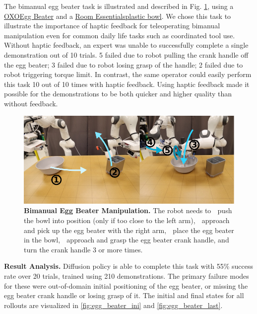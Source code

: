 The bimanual egg beater task is illustrated and described in Fig. \ref{fig:real_egg_beater}, using a
\href{https://www.oxo.com/egg-beater.html}{OXO\legalTM Egg Beater} and a
\href{https://www.target.com/p/114oz-plastic-serving-bowl-jet-gray-room-essentials-8482/-/A-86701588}{Room Essentials\legalTM plastic bowl}. We chose this task to illustrate the importance of haptic feedback for teleoperating bimanual manipulation even for common daily life tasks such as coordinated tool use. Without haptic feedback, an expert was unable to successfully complete a single demonstration out of 10 trials. 5 failed due to robot pulling the crank handle off the egg beater; 3 failed due to robot losing grasp of the handle; 2 failed due to robot triggering torque limit. In contrast, the same operator could easily perform this task 10 out of 10 times with haptic feedback. Using haptic feedback made it possible for the demonstrations to be both quicker and higher quality than without feedback.

\begin{figure}[t]
\centering
\includegraphics[width=\linewidth]{figure/real_egg_beater_setup_compressed.pdf}
\caption{\textbf{Bimanual Egg Beater Manipulation. }
\label{fig:real_egg_beater}
The robot needs to
\textcircled{} push the bowl into position (only if too close to the left arm),
\textcircled{} approach and pick up the egg beater with the right arm,
\textcircled{} place the egg beater in the bowl,
\textcircled{} approach and grasp the egg beater crank handle, and
\textcircled{} turn the crank handle 3 or more times.
}
\vspace{-4mm}
\end{figure}

\textbf{Result Analysis.} Diffusion policy is able to complete this task with 55\% success rate over 20 trials, trained using 210 demonstrations. The primary failure modes for these were out-of-domain initial positioning of the egg beater, or missing the egg beater crank handle or losing grasp of it. The initial and final states for all rollouts are visualized in \ref{fig:egg_beater_ini} and \ref{fig:egg_beater_last}.



